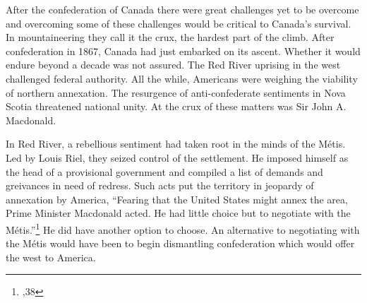 \documentclass[12pt]{article} %
\begin{document}
\begin{titlepage}




 


\end{titlepage}



\pagestyle{fancy}



After the confederation of Canada there were great challenges yet to be overcome and overcoming some of these challenges would be critical to Canada's survival.
In mountaineering they call it the crux, the hardest part of the climb. 
After confederation in 1867, Canada had just embarked on its ascent. 
Whether it would endure beyond a decade was not assured. 
The Red River uprising in the west challenged federal authority.
All the while, Americans were weighing the viability of northern annexation.
The resurgence of anti-confederate sentiments in Nova Scotia threatened national unity.
At the crux of these matters was Sir John A. Macdonald.

In Red River, a rebellious sentiment had taken root in the minds of the M\'{e}tis. 
Led by Louis Riel, they seized control of the settlement. 
He imposed himself as the head of a provisional government and compiled a list of demands and greivances in need of redress. 
Such acts put the territory in jeopardy of annexation by America, ``Fearing that the United States might annex the area, Prime Minister Macdonald acted. He had little choice but to negotiate with the M\'{e}tis.''\footnote{\cite{Francis2012},38} 
He did have another option to choose. An alternative to negotiating with the M\'{e}tis would have been to begin dismantling confederation which would offer the west to America.
\end{document}
